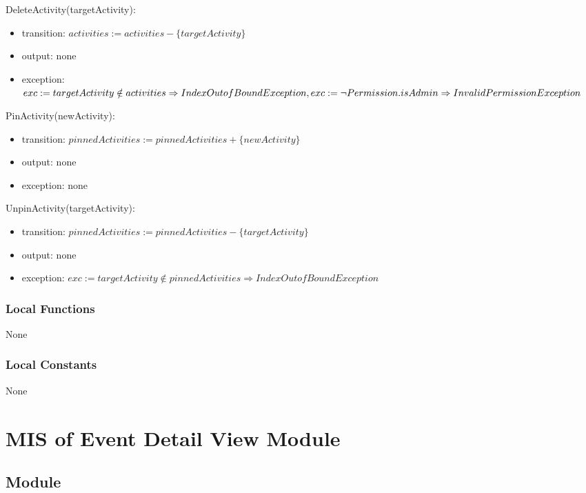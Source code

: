 \documentclass[12pt, titlepage]{article}
\begin{document}
\noindent DeleteActivity(targetActivity):
\begin{itemize}
\item transition: $activities := activities - \{targetActivity\}$
\item output: none
\item exception: $exc := targetActivity \notin activities \Rightarrow IndexOutofBound Exception,\\
                  exc := \neg Permission.isAdmin \Rightarrow InvalidPermission Exception$
\end{itemize}

\noindent PinActivity(newActivity):
\begin{itemize}
\item transition: $pinnedActivities := pinnedActivities + \{newActivity\}$
\item output: none
\item exception: none
\end{itemize}

\noindent UnpinActivity(targetActivity):
\begin{itemize}
\item transition: $pinnedActivities := pinnedActivities - \{targetActivity\}$
\item output: none
\item exception: $exc := targetActivity \notin pinnedActivities \Rightarrow IndexOutofBound Exception$
\end{itemize}

\subsubsection{Local Functions}

None

\subsubsection{Local Constants}

None

\newpage

\section{MIS of Event Detail View Module} \label{mEDV}

\subsection{Module}
\end{document}
